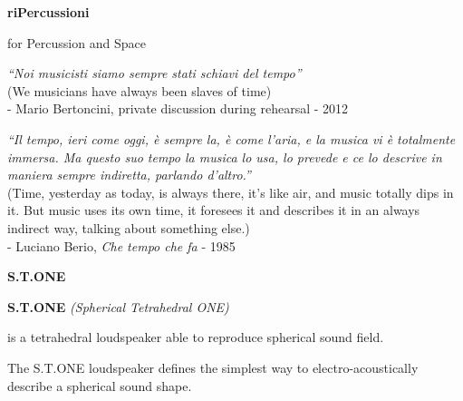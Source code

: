 \documentclass[10pt]{beamer}
\begin{document}

{%

\begin{frame}[fragile]{\textbf{riPercussioni}}

for Percussion and Space

\bigskip

\emph{“Noi musicisti siamo sempre stati schiavi del tempo”} \\
(We musicians have always been slaves of time) \\- Mario Bertoncini, private discussion during rehearsal - 2012

\bigskip

\emph{“Il tempo, ieri come oggi, è sempre la, è come l'aria, e la musica vi è totalmente immersa. Ma questo suo tempo la musica lo usa, lo prevede e ce lo descrive in maniera sempre indiretta, parlando d'altro.”} \\
(Time, yesterday as today, is always there, it's like air, and music totally dips in it. But music uses its own time, it foresees it and describes it in an always indirect way, talking about something else.) \\- Luciano Berio, \emph{Che tempo che fa} - 1985
\end{frame}
}


{%

\begin{frame}[fragile]{\textbf{S.T.ONE}}

\textbf{S.T.ONE} {\it (Spherical Tetrahedral ONE)}

is a tetrahedral loudspeaker able to reproduce spherical sound field.

The S.T.ONE loudspeaker defines the simplest way to electro-acoustically describe a spherical sound shape.

\end{frame}
}
\end{document}
